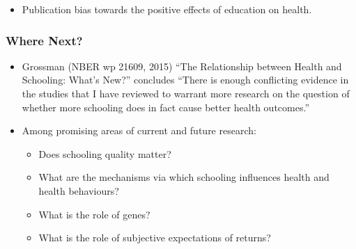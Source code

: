 \begin{itemize}
    \item Publication bias towards the positive effects of education on health.
\end{itemize}

\subsubsection{Where Next?}
\begin{itemize}
    \item Grossman (NBER wp 21609, 2015) “The Relationship between Health and Schooling: What’s New?” concludes “There is enough conflicting evidence in the studies that I have reviewed to warrant more research on the question of whether more schooling does in fact cause better health outcomes.”
    \item Among promising areas of current and future research:
    \begin{itemize}
    \item Does schooling quality matter?
    \item What are the mechanisms via which schooling influences health and health behaviours?
    \item What is the role of genes?
    \item What is the role of subjective expectations of returns?
    \end{itemize}
\end{itemize}

